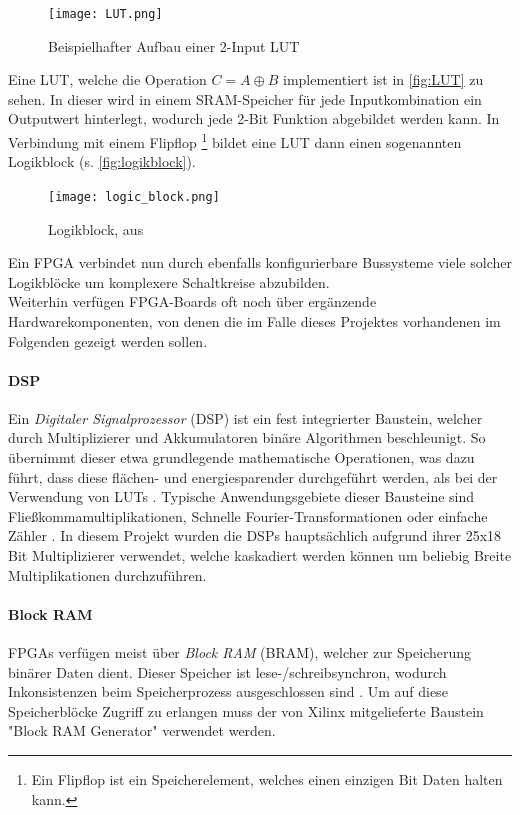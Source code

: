 \documentclass[a4paper,12pt,onesided]{report}
\begin{document}
\begin{figure}[H]
	\centering
	\texttt{[image: LUT.png]}
	\caption{Beispielhafter Aufbau einer 2-Input LUT}
	\label{fig:LUT}
\end{figure}

Eine LUT, welche die Operation $C = A \oplus B$ implementiert ist in \autoref{fig:LUT} zu sehen. In dieser wird in einem SRAM-Speicher für jede Inputkombination ein Outputwert hinterlegt, wodurch jede 2-Bit Funktion abgebildet werden kann. In Verbindung mit einem Flipflop \footnote{Ein Flipflop ist ein Speicherelement, welches einen einzigen Bit Daten halten kann.} bildet eine LUT dann einen sogenannten Logikblock (s. \autoref{fig:logikblock}).\cite{fpgaDesign}

\begin{figure}[H]
	\centering
	\texttt{[image: logic\_block.png]}
	\caption{Logikblock, aus \cite{fpgaDesign}}
	\label{fig:logikblock}
\end{figure}

Ein FPGA verbindet nun durch ebenfalls konfigurierbare Bussysteme viele solcher Logikblöcke um komplexere Schaltkreise abzubilden.\\
Weiterhin verfügen FPGA-Boards oft noch über ergänzende Hardwarekomponenten, von denen die im Falle dieses Projektes vorhandenen im Folgenden gezeigt werden sollen.

\paragraph{DSP}
Ein \textit{Digitaler Signalprozessor} (DSP) ist ein fest integrierter Baustein, welcher durch Multiplizierer und Akkumulatoren binäre Algorithmen beschleunigt.
So übernimmt dieser etwa grundlegende mathematische Operationen, was dazu führt, dass diese flächen- und energiesparender durchgeführt werden, als bei der Verwendung von LUTs \cite[S. 52]{dsps}.
Typische Anwendungsgebiete dieser Bausteine sind Fließkommamultiplikationen, Schnelle Fourier-Transformationen oder einfache Zähler \cite[S. 14]{dsps}. 
In diesem Projekt wurden die DSPs hauptsächlich aufgrund ihrer 25x18 Bit Multiplizierer verwendet, welche kaskadiert werden können um beliebig Breite Multiplikationen durchzuführen.

\paragraph{Block RAM}
FPGAs verfügen meist über \textit{Block RAM} (BRAM), welcher zur Speicherung binärer Daten dient. Dieser Speicher ist lese-/schreibsynchron, wodurch Inkonsistenzen beim Speicherprozess ausgeschlossen sind \cite[S. 11]{bram}. Um auf diese Speicherblöcke Zugriff zu erlangen muss der von Xilinx mitgelieferte Baustein "Block RAM Generator" verwendet werden.
\end{document}
